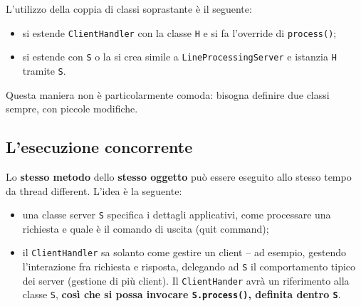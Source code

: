\documentclass[\fontsizeclass,twocolumn]{\classname}
\theoremstyle{definition}
\theoremstyle{definition}
\begin{document}
L'utilizzo della coppia di classi soprastante è il seguente:
\begin{itemize}
    \item si estende \texttt{ClientHandler} con la classe \texttt{H} e si fa
        l'override di \texttt{process()};
    \item si estende con \texttt{S} o la si crea simile a
        \texttt{LineProcessing\-Server} e istanzia \texttt{H} tramite \texttt{S}.
\end{itemize}

Questa maniera non è particolarmente comoda: bisogna definire due classi
sempre, con piccole modifiche.

\subsection{L'esecuzione concorrente}

Lo \textbf{stesso metodo} dello \textbf{stesso oggetto} può essere eseguito
allo stesso tempo da thread different. L'idea è la seguente:
\begin{itemize}
    \item una classe server \texttt{S} specifica i dettagli applicativi, come
        processare una richiesta e quale è il comando di uscita (quit command);
    \item il \texttt{ClientHandler} sa solanto come gestire un client -- ad
        esempio, gestendo l'interazione fra richiesta e risposta, delegando ad
        \texttt{S} il comportamento tipico dei server (gestione di più client).
        Il \texttt{ClientHander} avrà un riferimento alla classe \texttt{S},
        \textbf{così che si possa invocare \texttt{S.process()}, definita
        dentro \texttt{S}}.
\end{itemize}
\end{document}
